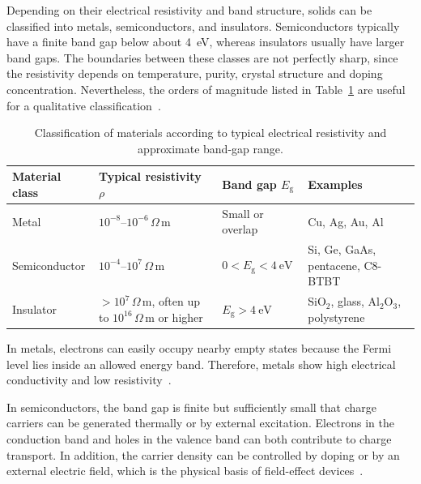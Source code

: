 Depending on their electrical resistivity and band structure, solids can be classified into metals, semiconductors, and insulators. Semiconductors typically have a finite band gap below about \SI{4}{\electronvolt}, whereas insulators
usually have larger band gaps. The boundaries between these classes are not perfectly sharp, since the resistivity depends on temperature, purity, crystal structure and doping concentration. Nevertheless, the orders of magnitude listed
in Table~\ref{tab:material_classification} are useful for a qualitative classification~\cite{Kittel2004,Neamen}.

\begin{table}[h]
    \centering
    \begin{tabular}{p{3cm} p{4cm} p{3cm} p{3.4cm}}
        \hline
        \textbf{Material class} &
        \textbf{Typical resistivity $\rho$} &
        \textbf{Band gap $E_\mathrm{g}$} &
        \textbf{Examples} \\
        \hline
        Metal &
        $10^{-8}$--$10^{-6}\,\Omega\,\mathrm{m}$ &
        Small or overlap  &
        Cu, Ag, Au, Al \\

        Semiconductor &
        $10^{-4}$--$10^{7}\,\Omega\,\mathrm{m}$ &
        $0<E_\mathrm{g}<\SI{4}{\electronvolt}$ &
        Si, Ge, GaAs, pentacene, C8-BTBT \\

        Insulator &
        $>10^{7}\,\Omega\,\mathrm{m}$, often up to
        $10^{16}\,\Omega\,\mathrm{m}$ or higher &
        $E_\mathrm{g}>\SI{4}{\electronvolt}$ &
        SiO$_2$, glass, Al$_2$O$_3$, polystyrene \\
        \hline
    \end{tabular}
    \caption{Classification of materials according to typical electrical
    resistivity and approximate band-gap range.}
    \label{tab:material_classification}
\end{table}

In metals, electrons can easily occupy nearby empty states because the Fermi level lies inside an allowed energy band. Therefore, metals show high electrical conductivity and low resistivity~\cite{Kittel2004,Neamen}.

In semiconductors, the band gap is finite but sufficiently small that charge carriers can be generated thermally or by external excitation. Electrons in the conduction band and holes in the valence band can both contribute to charge
transport. In addition, the carrier density can be controlled by doping or by an external electric field, which is the physical basis of field-effect devices~\cite{Neamen}.


